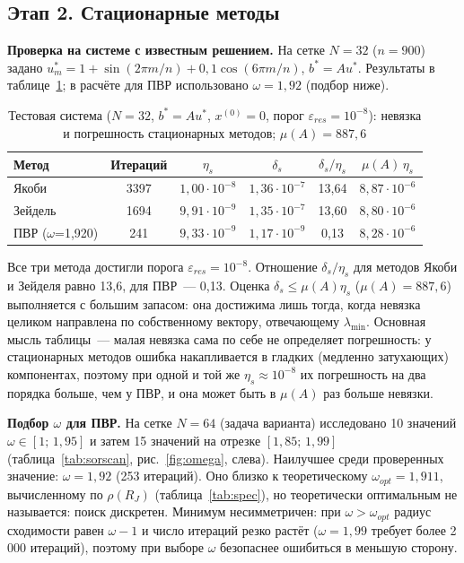 \documentclass[12pt]{article}
\begin{document}
\subsection{Этап 2. Стационарные методы}

\textbf{Проверка на системе с известным решением.} На сетке $N=32$ ($n=900$) задано $u^*_m=1+\sin(2\pi m/n)+0{,}1\cos(6\pi m/n)$, $b^*=Au^*$. Результаты в таблице~\ref{tab:test_stat}; в расчёте для ПВР использовано $\omega=1{,}92$ (подбор ниже).\par

\begin{table}[H]
\centering
\caption{Тестовая система ($N=32$, $b^*=Au^*$, $x^{(0)}=0$, порог $\varepsilon_{res}=10^{-8}$): невязка и погрешность стационарных методов; $\mu(A)=887{,}6$}
\label{tab:test_stat}
\small
\begin{tabular}{|l|c|c|c|c|c|}
\hline
Метод & Итераций & $\eta_s$ & $\delta_s$ & $\delta_s/\eta_s$ & $\mu(A)\,\eta_s$ \\
\hline
Якоби & 3397 & $1{,}00\cdot10^{-8}$ & $1{,}36\cdot10^{-7}$ & 13,64 & $8{,}87\cdot10^{-6}$ \\
Зейдель & 1694 & $9{,}91\cdot10^{-9}$ & $1{,}35\cdot10^{-7}$ & 13,60 & $8{,}80\cdot10^{-6}$ \\
ПВР ($\omega$=1,920) & 241 & $9{,}33\cdot10^{-9}$ & $1{,}17\cdot10^{-9}$ & 0,13 & $8{,}28\cdot10^{-6}$ \\
\hline
\end{tabular}
\end{table}

Все три метода достигли порога $\varepsilon_{res}=10^{-8}$. Отношение $\delta_s/\eta_s$ для методов Якоби и Зейделя равно 13,6, для ПВР~--- 0,13. Оценка $\delta_s\le\mu(A)\eta_s$ ($\mu(A)=887{,}6$) выполняется с большим запасом: она достижима лишь тогда, когда невязка целиком направлена по собственному вектору, отвечающему $\lambda_{\min}$. Основная мысль таблицы~--- малая невязка сама по себе не определяет погрешность: у стационарных методов ошибка накапливается в гладких (медленно затухающих) компонентах, поэтому при одной и той же $\eta_s\approx10^{-8}$ их погрешность на два порядка больше, чем у ПВР, и она может быть в $\mu(A)$ раз больше невязки.\par

\textbf{Подбор $\omega$ для ПВР.} На сетке $N=64$ (задача варианта) исследовано 10 значений $\omega\in[1;\,1{,}95]$ и затем 15 значений на отрезке $[1{,}85;\,1{,}99]$ (таблица~\ref{tab:sorscan}, рис.~\ref{fig:omega}, слева). Наилучшее среди проверенных значение: $\omega=1{,}92$ (253 итераций). Оно близко к теоретическому $\omega_{opt}=1{,}911$, вычисленному по $\rho(R_J)$ (таблица~\ref{tab:spec}), но теоретически оптимальным не называется: поиск дискретен. Минимум несимметричен: при $\omega>\omega_{opt}$ радиус сходимости равен $\omega-1$ и число итераций резко растёт ($\omega=1{,}99$ требует более 2\,000 итераций), поэтому при выборе $\omega$ безопаснее ошибиться в меньшую сторону.\par
\end{document}
